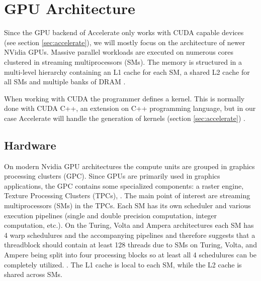 
\section{GPU Architecture}
Since the GPU backend of Accelerate only works with CUDA capable devices (see section \ref{sec:accelerate}), we will mostly focus on the architecture of newer NVidia GPUs.
Massive parallel workloads are executed on numerous cores clustered in streaming multiprocessors (SMs).
The memory is structured in a multi-level hierarchy containing an L1 cache for each SM, a shared L2 cache for all SMs and multiple banks of DRAM \cite{nvidia2017volta,nvidia2020ampere}.

When working with CUDA the programmer defines a kernel.
This is normally done with CUDA C++, an extension on C++ programming language, but in our case Accelerate will handle the generation of kernels (section \ref{sec:accelerate}) \cite{nvidia2021cudadocs}.

\subsection{Hardware}
On modern Nvidia GPU architectures the compute units are grouped in graphics processing clusters (GPC).
Since GPUs are primarily used in graphics applications, the GPC contains some specialized components: a raster engine, Texture Processing Clusters (TPCs), \TODO{\dots}.
The main point of interest are streaming multiprocessors (SMs) in the TPCs.
Each SM has its own scheduler and various execution pipelines (single and double precision computation, integer computation, etc.).
On the Turing, Volta and Ampera architectures each SM has 4 warp schedulures and the accompanying pipelines and therefore \citeauthor{jia2019dissecting} suggests that a threadblock should contain at least 128 threads due to SMs on Turing, Volta, and Ampere being split into four processing blocks so at least all 4 schedulures can be completely utilized. \cite{jia2019dissecting,nvidia2017volta,nvidia2018turing,nvidia2020ampere}.
The L1 cache is local to each SM, while the L2 cache is shared across SMs.


